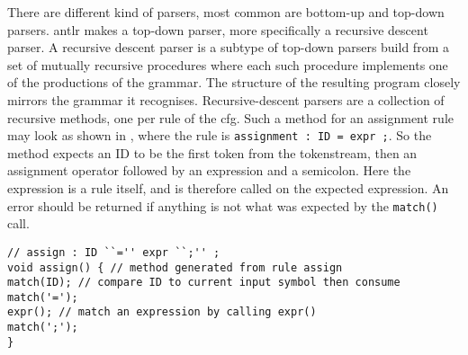 There are different kind of parsers, most common are bottom-up and top-down parsers.
\acrshort{antlr} makes a top-down parser, more specifically a recursive descent parser.
A recursive descent parser is a subtype of top-down parsers build from a set of mutually recursive procedures where each such procedure implements one of the productions of the grammar.
The structure of the resulting program closely mirrors the grammar it recognises. \citep{Recursive_programming}
Recursive-descent parsers are a collection of recursive methods, one per rule of the \acrshort{cfg}.
Such a method for an assignment rule may look as shown in , where the rule is \texttt{assignment : ID = expr ;}.
So the method expects an ID to be the first token from the tokenstream, then an assignment operator followed by an expression and a semicolon.
Here the expression is a rule itself, and is therefore called on the expected expression.
An error should be returned if anything is not what was expected by the \texttt{match()} call.
\begin{lstlisting}[caption=Example a recursive descent parser method,frame=tlrb,label={lst:rdpmethod}]
// assign : ID ``='' expr ``;'' ;
void assign() { // method generated from rule assign
match(ID); // compare ID to current input symbol then consume
match('=');
expr(); // match an expression by calling expr()
match(';');
}
\end{lstlisting}
